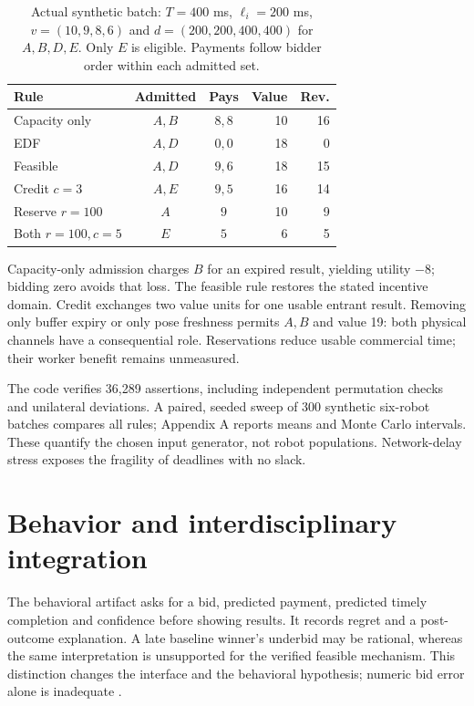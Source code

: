 \begin{table}[h]
\caption{Actual synthetic batch: $T=400$ ms, $\ell_i=200$ ms, $v=(10,9,8,6)$ and $d=(200,200,400,400)$ for $A,B,D,E$. Only $E$ is eligible. Payments follow bidder order within each admitted set.}
\centering\small\setlength{\tabcolsep}{3pt}
\begin{tabular}{lccrr}\toprule
Rule & Admitted & Pays & Value & Rev.\\\midrule
Capacity only & $A,B$ & $8,8$ & 10 & 16\\
EDF & $A,D$ & $0,0$ & 18 & 0\\
Feasible & $A,D$ & $9,6$ & 18 & 15\\
Credit $c=3$ & $A,E$ & $9,5$ & 16 & 14\\
Reserve $r=100$ & $A$ & $9$ & 10 & 9\\
Both $r=100,c=5$ & $E$ & $5$ & 6 & 5\\\bottomrule
\end{tabular}\label{tab:worked}
\end{table}
Capacity-only admission charges $B$ for an expired result, yielding utility $-8$; bidding zero avoids that loss. The feasible rule restores the stated incentive domain. Credit exchanges two value units for one usable entrant result. Removing only buffer expiry or only pose freshness permits $A,B$ and value 19: both physical channels have a consequential role. Reservations reduce usable commercial time; their worker benefit remains unmeasured.

The code verifies 36,289 assertions, including independent permutation checks and unilateral deviations. A paired, seeded sweep of 300 synthetic six-robot batches compares all rules; Appendix A reports means and Monte Carlo intervals. These quantify the chosen input generator, not robot populations. Network-delay stress exposes the fragility of deadlines with no slack.

\section{Behavior and interdisciplinary integration}
The behavioral artifact asks for a bid, predicted payment, predicted timely completion and confidence before showing results. It records regret and a post-outcome explanation. A late baseline winner's underbid may be rational, whereas the same interpretation is unsupported for the verified feasible mechanism. This distinction changes the interface and the behavioral hypothesis; numeric bid error alone is inadequate \cite{hassidim}.

